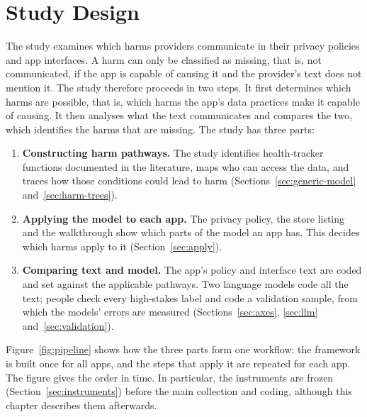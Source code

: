 \section{Study Design}
\label{sec:design}
The study examines which harms providers communicate in their privacy policies and app
interfaces. A harm can only be classified as missing, that is, not communicated, if the app is
capable of causing it and the provider's text does not mention it. The study therefore proceeds
in two steps. It first determines which harms are possible, that is, which harms the app's data
practices make it capable of causing. It then analyses what the text communicates and compares
the two, which identifies the harms that are missing. The study has three parts:
\begin{enumerate}[itemsep=1pt,topsep=3pt]
  \item \textbf{Constructing harm pathways.} The study identifies health-tracker functions
    documented in the literature, maps who can access the data, and traces how those
    conditions could lead to harm (Sections~\ref{sec:generic-model} and~\ref{sec:harm-trees}).
  \item \textbf{Applying the model to each app.} The privacy policy, the store
    listing and the walkthrough show which parts of the model an app has. This
    decides which harms apply to it (Section~\ref{sec:apply}).
  \item \textbf{Comparing text and model.} The app's policy and interface text are
    coded and set against the applicable pathways. Two language models code all the
    text; people check every high-stakes label and code a validation sample, from
    which the models' errors are measured (Sections~\ref{sec:axes}, \ref{sec:llm}
    and~\ref{sec:validation}).
\end{enumerate}
Figure~\ref{fig:pipeline} shows how the three parts form one workflow: the framework is
built once for all apps, and the steps that apply it are repeated for each app. The figure gives
the order in time. In particular, the instruments are frozen
(Section~\ref{sec:instruments}) before the main collection and coding, although this chapter
describes them afterwards.

